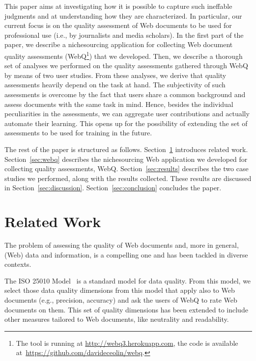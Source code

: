 \documentclass{llncs}
\begin{document}
This paper aims at investigating how it is possible to capture such ineffable judgments and at understanding how they are characterized. In particular, our current focus is on the quality assessment of Web documents to be used for professional use (i.e., by journalists and media scholars). 
In the first part of the paper, we describe a nichesourcing application for collecting Web document quality assessments (WebQ\footnote{The tool is running at \url{http://webq3.herokuapp.com}, the code is available at~\url{https://github.com/davideceolin/webq}.}) that we developed. Then, we describe a thorough set of analyses we performed on the quality assessments gathered through WebQ by means of two user studies. From these analyses, we derive that quality assessments heavily depend on the task at hand. The subjectivity of such assessments is overcome by the fact that users share a common background and assess documents with the same task in mind. Hence, besides the individual peculiarities in the assessments, we can aggregate user contributions and actually automate their learning. This opens up for the possibility of extending the set of assessments to be used for training in the future.

The rest of the paper is structured as follows. Section~\ref{sec:related} introduces related work. Section~\ref{sec:webq} describes the nichesourcing Web application we developed for collecting quality assessments, WebQ.
Section~\ref{sec:results} describes the two case studies we performed, along with the results collected. These results are discussed in Section~\ref{sec:discussion}. Section~\ref{sec:conclusion} concludes the paper.


\section{Related Work}
\label{sec:related}

The problem of assessing the quality of Web documents and, more in general, (Web) data and information, is a compelling one and has been tackled in diverse contexts. 

The ISO 25010 Model~\cite{iso} is a standard model for data quality. From this model, we select those data quality dimensions from this model that apply also to Web documents (e.g., precision, accuracy) and ask the users of WebQ to rate Web documents on them. This set of quality dimensions has been extended to include other measures tailored to Web documents, like neutrality and readability.
\end{document}
